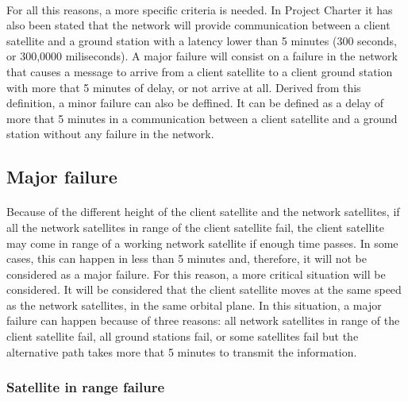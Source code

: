\paragraph{}For all this reasons, a more specific criteria is needed. In Project Charter it has also been stated that the network will provide communication between a client satellite and a ground station with a latency lower than 5 minutes (300 seconds, or 300,0000 miliseconds). A major failure will consist on a failure in the network that causes a message to arrive from a client satellite to a client ground station with more that 5 minutes of delay, or not arrive at all. Derived from this definition, a minor failure can also be deffined. It can be defined as a delay of more that 5 minutes in a communication between a client satellite and a ground station without any failure in the network.

\subsection{Major failure}

\paragraph{}Because of the different height of the client satellite and the network satellites, if all the network satellites in range of the client satellite fail, the client satellite may come in range of a working network satellite if enough time passes. In some cases, this can happen in less than 5 minutes and, therefore, it will not be considered as a major failure. For this reason, a more critical situation will be considered. It will be considered that the client satellite moves at the same speed as the network satellites, in the same orbital plane. In this situation, a major failure can happen because of three reasons: all network satellites in range of the client satellite fail, all ground stations fail, or some satellites fail but the alternative path takes more that 5 minutes to transmit the information.

\subsubsection{Satellite in range failure}

